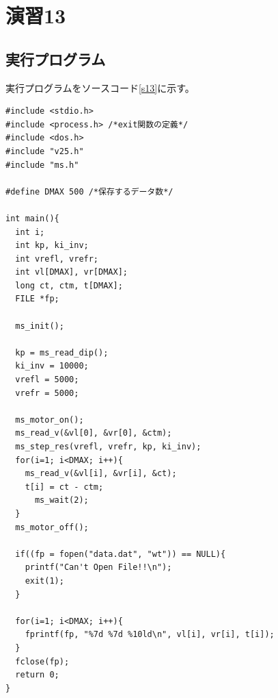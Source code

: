 \section{演習13}
\subsection{実行プログラム}
実行プログラムをソースコード\ref{s13}に示す。
\begin{lstlisting}[caption=演習13のプログラム,label=s13]
#include <stdio.h>
#include <process.h> /*exit関数の定義*/
#include <dos.h>
#include "v25.h"
#include "ms.h"
  
#define DMAX 500 /*保存するデータ数*/
  
int main(){
  int i;
  int kp, ki_inv;
  int vrefl, vrefr;
  int vl[DMAX], vr[DMAX];
  long ct, ctm, t[DMAX];
  FILE *fp;
  
  ms_init();
  
  kp = ms_read_dip();
  ki_inv = 10000;
  vrefl = 5000;
  vrefr = 5000;
  
  ms_motor_on();
  ms_read_v(&vl[0], &vr[0], &ctm);
  ms_step_res(vrefl, vrefr, kp, ki_inv);
  for(i=1; i<DMAX; i++){
    ms_read_v(&vl[i], &vr[i], &ct);
    t[i] = ct - ctm;
      ms_wait(2);
  }
  ms_motor_off();
  
  if((fp = fopen("data.dat", "wt")) == NULL){
    printf("Can't Open File!!\n");
    exit(1);
  }
  
  for(i=1; i<DMAX; i++){
    fprintf(fp, "%7d %7d %10ld\n", vl[i], vr[i], t[i]);
  }
  fclose(fp);
  return 0;
}
\end{lstlisting}

